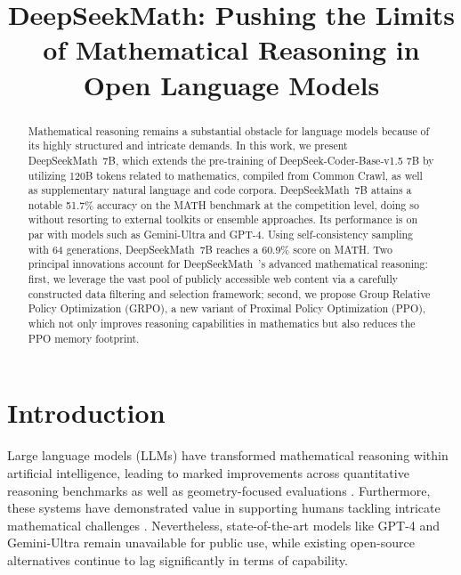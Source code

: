 \title{DeepSeekMath: Pushing the Limits of Mathematical Reasoning in Open Language Models}

\begin{abstract}
Mathematical reasoning remains a substantial obstacle for language models because of its highly structured and intricate demands. In this work, we present DeepSeekMath~7B, which extends the pre-training of DeepSeek-Coder-Base-v1.5 7B by utilizing 120B tokens related to mathematics, compiled from Common Crawl, as well as supplementary natural language and code corpora. DeepSeekMath~7B attains a notable 51.7\% accuracy on the MATH benchmark at the competition level, doing so without resorting to external toolkits or ensemble approaches. Its performance is on par with models such as Gemini-Ultra and GPT-4. Using self-consistency sampling with 64 generations, DeepSeekMath~7B reaches a 60.9\% score on MATH. Two principal innovations account for DeepSeekMath~'s advanced mathematical reasoning: first, we leverage the vast pool of publicly accessible web content via a carefully constructed data filtering and selection framework; second, we propose Group Relative Policy Optimization (GRPO), a new variant of Proximal Policy Optimization (PPO), which not only improves reasoning capabilities in mathematics but also reduces the PPO memory footprint.
\end{abstract}

\section{Introduction}

Large language models (LLMs) have transformed mathematical reasoning within artificial intelligence, leading to marked improvements across quantitative reasoning benchmarks \citep{MATH} as well as geometry-focused evaluations \citep{trinh2024solving}. Furthermore, these systems have demonstrated value in supporting humans tackling intricate mathematical challenges \citep{tao}. Nevertheless, state-of-the-art models like GPT-4 \citep{gpt4} and Gemini-Ultra \citep{gemini} remain unavailable for public use, while existing open-source alternatives continue to lag significantly in terms of capability.

